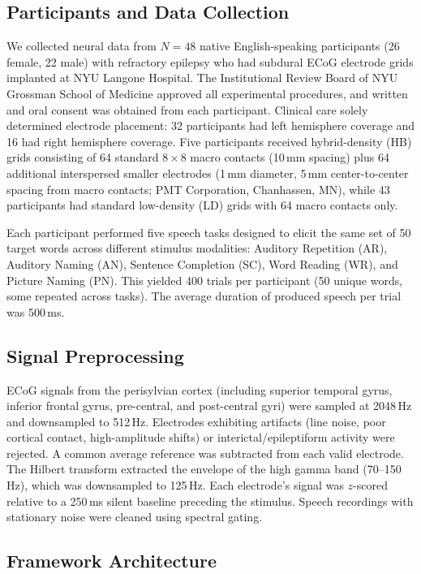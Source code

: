 \documentclass[11pt]{article}
\begin{document}
\subsection{Participants and Data Collection}

We collected neural data from $N=48$ native English-speaking participants (26 female, 22 male) with refractory epilepsy who had subdural ECoG electrode grids implanted at NYU Langone Hospital. The Institutional Review Board of NYU Grossman School of Medicine approved all experimental procedures, and written and oral consent was obtained from each participant. Clinical care solely determined electrode placement: 32 participants had left hemisphere coverage and 16 had right hemisphere coverage. Five participants received hybrid-density (HB) grids consisting of 64 standard $8\times8$ macro contacts (10\,mm spacing) plus 64 additional interspersed smaller electrodes (1\,mm diameter, 5\,mm center-to-center spacing from macro contacts; PMT Corporation, Chanhassen, MN), while 43 participants had standard low-density (LD) grids with 64 macro contacts only.

Each participant performed five speech tasks designed to elicit the same set of 50 target words across different stimulus modalities: Auditory Repetition (AR), Auditory Naming (AN), Sentence Completion (SC), Word Reading (WR), and Picture Naming (PN). This yielded 400 trials per participant (50 unique words, some repeated across tasks). The average duration of produced speech per trial was 500\,ms.

\subsection{Signal Preprocessing}

ECoG signals from the perisylvian cortex (including superior temporal gyrus, inferior frontal gyrus, pre-central, and post-central gyri) were sampled at 2048\,Hz and downsampled to 512\,Hz. Electrodes exhibiting artifacts (line noise, poor cortical contact, high-amplitude shifts) or interictal/epileptiform activity were rejected. A common average reference was subtracted from each valid electrode. The Hilbert transform extracted the envelope of the high gamma band (70--150\,Hz), which was downsampled to 125\,Hz. Each electrode's signal was $z$-scored relative to a 250\,ms silent baseline preceding the stimulus. Speech recordings with stationary noise were cleaned using spectral gating.

\subsection{Framework Architecture}
\end{document}
